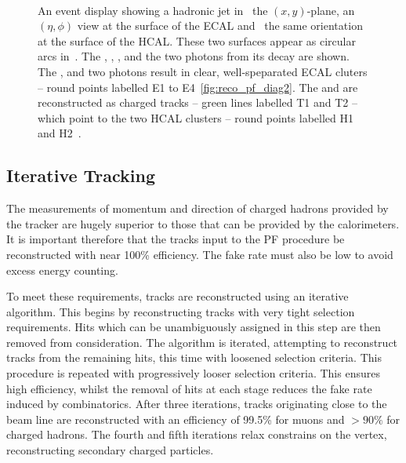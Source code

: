 \begin{figure}[h!]
\centering
{}\\
\quad
{}
\caption[]{An event display showing a hadronic jet in~
  the $(x,y)$-plane,  an $(\eta,\phi)$ view at the
  surface of the \ac{ECAL} and~ the same orientation
  at the surface of the \ac{HCAL}. These two surfaces appear as circular arcs
  in~. The \PKlong, \Ppiminus, \Ppiplus, \Ppizero and
  the two photons from its decay are shown. The \PKlong, \Ppiminus and two photons
  result in clear, well-speparated \ac{ECAL} cluters -- round points labelled E1
  to E4~\ref{fig:reco_pf_diag2}. The \Ppiplus and \Ppiminus are reconstructed as
  charged tracks -- green lines labelled T1 and T2 -- which point to the two
  \ac{HCAL} clusters -- round points labelled H1 and H2~\cite{cms_pf_pas}.}
\label{fig:reco_pf_diag}
\end{figure}

\subsection{Iterative Tracking}
The measurements of momentum and direction of charged hadrons provided by the
tracker are hugely superior to those that can be provided by the calorimeters.
It is important therefore that the tracks input to the \ac{PF} procedure be
reconstructed with near 100\% efficiency. The fake rate must also be low to
avoid excess energy counting.

To meet these requirements, tracks are reconstructed using an iterative
algorithm. This begins by reconstructing tracks with very tight selection
requirements. Hits which can be unambiguously assigned in this step are then
removed from consideration. The algorithm is iterated, attempting to reconstruct
tracks from the remaining hits, this time with loosened selection criteria. This
procedure is repeated with progressively looser selection criteria. This ensures
high efficiency, whilst the removal of hits at each stage reduces the fake rate
induced by combinatorics.  After three iterations, tracks originating close to
the beam line are reconstructed with an efficiency of 99.5\% for muons and
$>90\%$ for charged hadrons. The fourth and fifth iterations relax constrains on
the vertex, reconstructing secondary charged particles.

